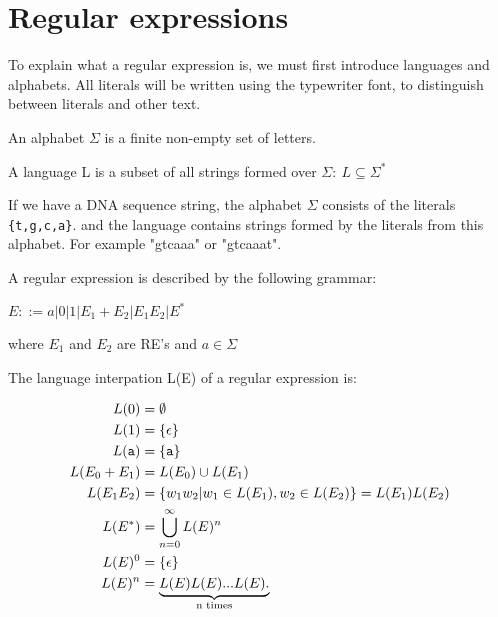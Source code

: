 \section{Regular expressions} 
  To explain what a regular expression is, we must first introduce languages and alphabets. All literals will be written using the typewriter font, to distinguish between literals and other text. 
\begin{mydef}\label{alph}
An alphabet $\Sigma$ is a finite non-empty set of letters.
\end{mydef}

\begin{mydef}\label{lang}
A language L is a subset of all strings formed over $\Sigma:~ L\subseteq \Sigma^*$
\end{mydef}

\begin{myex}\label{reex}
If we have a DNA sequence string, the alphabet $\Sigma$ consists of the literals {\tt\{t,g,c,a\}}. and the language contains strings formed by the literals from this alphabet. For example "gtcaaa" or "gtcaaat". 
\end{myex}


\begin{mydef}
A regular expression is described by the following grammar: \\
\begin{center}
$E::= a|0|1|E_1 + E_2 |E_1 E_2 | E^*$
\end{center}
where $E_1$ and $E_2$ are RE's and $a \in \Sigma$
\end{mydef}

\begin{mydef}\label{re}
The language interpation L(E) of a regular expression is: 
\begin{center}
\begin{align*}
L(0)           &= \emptyset\\
L(1)         &= \{\epsilon\} \\
L({\tt a})     &= \{{\tt a}\} \\
L(E_0 + E_1) &= L(E_0) \cup L(E_1) \\
L(E_1 E_2)   &= \{w_1w_2 | w_1 \in L(E_1),w_2 \in L(E_2)\}=L(E_1)L(E_2) \\
L(E^*)       &= \bigcup\limits_{n=0}^\infty L(E)^n \\
L(E)^0       &= \{\epsilon\}\\
L(E)^n       &= \underbrace{L(E)L(E)...L(E).}_\text{n times}
\end{align*}
\end{center}
\cite[p.5 def. 3]{crash}
\end{mydef}

